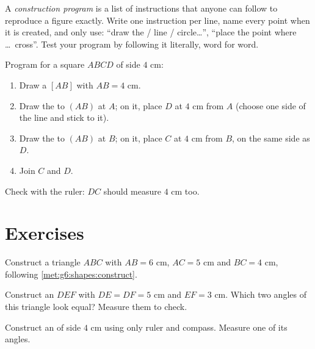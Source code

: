 \begin{method}\label{met:g6:shapes:program}
A \emph{construction program} is a list of instructions that anyone can
follow to reproduce a figure exactly. Write one instruction per line,
name every point when it is created, and only use: ``draw the 
/ line / circle\dots'', ``place the point where \dots\ cross''. Test
your program by following it literally, word for word.
\end{method}

\begin{example}\label{ex:g6:shapes:program}
Program for a square $ABCD$ of side $4$ cm:
\begin{enumerate}
  \item Draw a  $[AB]$ with $AB = 4$ cm.
  \item Draw the  to $(AB)$ at $A$; on it, place $D$ at
        $4$ cm from $A$ (choose one side of the line and stick to it).
  \item Draw the  to $(AB)$ at $B$; on it, place $C$ at
        $4$ cm from $B$, on the same side as $D$.
  \item Join $C$ and $D$.
\end{enumerate}
Check with the ruler: $DC$ should measure $4$ cm too.
\end{example}

\section{Exercises}

\begin{exercise}[$\star$]\label{exo:g6:shapes:1}
Construct a triangle $ABC$ with $AB = 6$ cm, $AC = 5$ cm and
$BC = 4$ cm, following \cref{met:g6:shapes:construct}.
\end{exercise}

\begin{exercise}[$\star$]\label{exo:g6:shapes:2}
Construct an  $DEF$ with $DE = DF = 5$ cm and
$EF = 3$ cm. Which two angles of this triangle look equal? Measure them
to check.
\end{exercise}

\begin{exercise}[$\star$]\label{exo:g6:shapes:3}
Construct an  of side $4$ cm using only ruler and
compass. Measure one of its angles.
\end{exercise}


